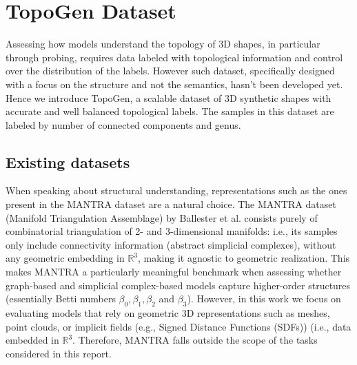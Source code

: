\section{TopoGen Dataset}
\label{sec:topogen}

Assessing how models understand the topology of 3D shapes, in particular through probing, requires data labeled with topological information and control over the distribution of the labels. However such dataset, specifically designed with a focus on the structure and not the semantics, hasn't been developed yet. Hence we introduce TopoGen, a scalable dataset of 3D synthetic shapes with accurate and well balanced topological labels. The samples in this dataset are labeled by number of connected components and genus.

\subsection{Existing datasets}
\label{ssec:existing_datasets}

When speaking about structural understanding, representations such as the ones present in the MANTRA \cite{mantra} dataset are a natural choice. The MANTRA dataset (Manifold Triangulation Assemblage) by Ballester et al. consists purely of combinatorial triangulation of 2- and 3-dimensional manifolds: i.e., its samples only include connectivity information (abstract simplicial complexes), without any geometric embedding in $\mathbb{R}^3$, making it agnostic to geometric realization. This makes MANTRA a particularly meaningful benchmark when assessing whether graph-based and simplicial complex-based models capture higher-order structures (essentially Betti numbers $\beta_0, \beta_1, \beta_2$ and $\beta_3$). However, in this work we focus on evaluating models that rely on geometric 3D representations such as meshes, point clouds, or implicit fields (e.g., Signed Distance Functions (SDFs)) (i.e., data embedded in $\mathbb{R}^3$. Therefore, MANTRA falls outside the scope of the tasks considered in this report.


